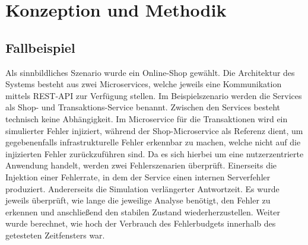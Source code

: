 \documentclass[
12pt,
a4paper,
twoside,
openright
]{report}
\begin{document}
	\chapter{Konzeption und Methodik}
	
	\section{Fallbeispiel}
	Als sinnbildliches Szenario wurde ein Online-Shop gewählt. Die Architektur des Systems besteht aus zwei Microservices, welche jeweils eine Kommunikation mittels REST-API zur Verfügung stellen. Im Beispielszenario werden die Services als Shop- und Transaktions-Service benannt. Zwischen den Services besteht technisch keine Abhängigkeit. Im Microservice für die Transaktionen wird ein simulierter Fehler injiziert, während der Shop-Microservice als Referenz dient, um gegebenenfalls infrastrukturelle Fehler erkennbar zu machen, welche nicht auf die injizierten Fehler zurückzuführen sind. Da es sich hierbei um eine nutzerzentrierte Anwendung handelt, werden zwei Fehlerszenarien überprüft. Einerseits die Injektion einer Fehlerrate, in dem der Service einen internen Serverfehler produziert. Andererseits die Simulation verlängerter Antwortzeit. Es wurde jeweils überprüft, wie lange die jeweilige Analyse benötigt, den Fehler zu erkennen und anschließend den stabilen Zustand wiederherzustellen. Weiter wurde berechnet, wie hoch der Verbrauch des Fehlerbudgets innerhalb des getesteten Zeitfensters war. 
	
\end{document}
